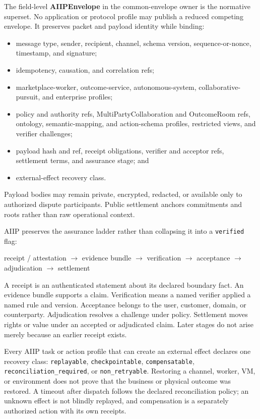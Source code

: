 \documentclass[
  11pt,
]{article}
\providecommand{\tightlist}{%
  \setlength{\itemsep}{0pt}\setlength{\parskip}{0pt}}
\begin{document}
The field-level \textbf{AIIPEnvelope} in the common-envelope owner is the
normative superset. No application or protocol profile may publish a reduced
competing envelope. It preserves packet and payload identity while binding:

\begin{itemize}
\tightlist
\item
  message type, sender, recipient, channel, schema version,
  sequence-or-nonce, timestamp, and signature;
\item
  idempotency, causation, and correlation refs;
\item
  marketplace-worker, outcome-service, autonomous-system,
  collaborative-pursuit, and enterprise profiles;
\item
  policy and authority refs, MultiPartyCollaboration and OutcomeRoom refs,
  ontology, semantic-mapping, and action-schema profiles, restricted views,
  and verifier challenges;
\item
  payload hash and ref, receipt obligations, verifier and acceptor refs,
  settlement terms, and assurance stage; and
\item
  external-effect recovery class.
\end{itemize}

Payload bodies may remain private, encrypted, redacted, or available only to
authorized dispute participants. Public settlement anchors commitments and
roots rather than raw operational context.

AIIP preserves the assurance ladder rather than collapsing it into a
\texttt{verified} flag:

\begin{center}
receipt / attestation $\rightarrow$ evidence bundle $\rightarrow$
verification $\rightarrow$ acceptance $\rightarrow$ adjudication
$\rightarrow$ settlement
\end{center}

A receipt is an authenticated statement about its declared boundary fact. An
evidence bundle supports a claim. Verification means a named verifier applied
a named rule and version. Acceptance belongs to the user, customer, domain, or
counterparty. Adjudication resolves a challenge under policy. Settlement moves
rights or value under an accepted or adjudicated claim. Later stages do not
arise merely because an earlier receipt exists.

Every AIIP task or action profile that can create an external effect declares
one recovery class: \texttt{replayable}, \texttt{checkpointable},
\texttt{compensatable}, \texttt{reconciliation\_required}, or
\texttt{non\_retryable}. Restoring a channel, worker, VM, or environment does
not prove that the business or physical outcome was restored. A timeout after
dispatch follows the declared reconciliation policy; an unknown effect is not
blindly replayed, and compensation is a separately authorized action with its
own receipts.
\end{document}
